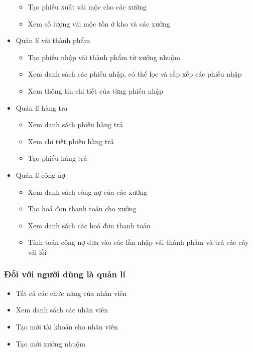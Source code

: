 \begin{itemize}
\begin{itemize}
        \item Tạo phiếu xuất vải mộc cho các xưởng
        \item Xem số lượng vải mộc tồn ở kho và các xưởng
    \end{itemize}
    \item Quản lí vải thành phẩm
    \begin{itemize}
        \item Tạo phiếu nhập vải thành phẩm từ xưởng nhuộm
        \item Xem danh sách các phiếu nhập, có thể lọc và sắp xếp các phiếu nhập
        \item Xem thông tin chi tiết của từng phiếu nhập
    \end{itemize}
    \item Quản lí hàng trả
    \begin{itemize}
        \item Xem danh sách phiếu hàng trả
        \item Xem chi tiết phiếu hàng trả
        \item Tạo phiếu hàng trả
    \end{itemize}
    \item Quản lí công nợ
    \begin{itemize}
        \item Xem danh sách công nợ của các xưởng
        \item Tạo hoá đơn thanh toán cho xưởng 
        \item Xem danh sách các hoá đơn thanh toán
        \item Tính toán công nợ dựa vào các lần nhập vải thành phẩm và trả các cây vải lỗi
    \end{itemize}
\end{itemize}
\subsubsection{Đối với người dùng là quản lí}
\begin{itemize}
    \item Tất cả các chức năng của nhân viên
    \item Xem danh sách các nhân viên
    \item Tạo mới tài khoản cho nhân viên
    \item Tạo mới xưởng nhuộm
\end{itemize}
